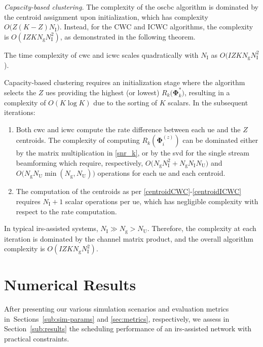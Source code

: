 \emph{Capacity-based clustering.}
The complexity of the \gls{oscbc} algorithm is dominated by the centroid assignment upon initialization, which has complexity $O\big(Z(K-Z)N_{\mathrm I}\big)$. Instead, for the CWC and ICWC algorithms, the complexity is $O(IZKN_{\mathrm g}N_{\mathrm I}^2)$, as demonstrated in the following theorem.

\begin{theorem}
The time complexity of \gls{cwc} and \gls{icwc} scales quadratically with $N_{\mathrm I}$ as $O(IZKN_{\mathrm g}N_{\mathrm I}^2$).
\end{theorem}
\begin{IEEEproof}
Capacity-based clustering requires an initialization stage where the algorithm selects the $Z$ \glspl{ue} providing the highest (or lowest) $R_k\big(\bm{\Phi}^*_k\big)$, resulting in a complexity of $O(K\log K)$ due to the sorting of $K$ scalars.
In the subsequent iterations:
\begin{enumerate}
    \item Both \gls{cwc} and \gls{icwc} compute the rate difference between each \gls{ue} and the $Z$ centroids. The complexity of computing $R_k(\bm{\Phi}^{(z)}_{i})$ can be dominated either by the matrix multiplication in \eqref{snr_k}, or by the \gls{svd} for the single stream beamforming which require, respectively, $O\big(N_{\mathrm g}N_{\mathrm I}^2 + N_{\mathrm g}N_{\mathrm I}N_{\mathrm U}\big)$ and $O\big(N_{\mathrm g}N_{\mathrm U}\min(N_{\mathrm g},N_{\mathrm U})\big)$ operations for each \gls{ue} and each centroid.
    \item The computation of the centroids as per \eqref{centroidCWC}-\eqref{centroidICWC} requires $N_{\mathrm I}+1$ scalar operations per \gls{ue}, which has negligible complexity with respect to the rate computation.
 \end{enumerate}
In typical \gls{irs}-assisted systems, $N_{\mathrm I}\gg N_{\mathrm g}>N_{\mathrm U}$. Therefore, the complexity at each iteration is dominated by the channel matrix product, and the overall algorithm complexity is $O(IZKN_{\mathrm g}N_{\mathrm I}^2)$. 
\end{IEEEproof}

\section{Numerical Results}\label{sec:numerical_results}

After presenting our various simulation scenarios and evaluation metrics in~Sections~\ref{sub:sim-params} and \ref{sec:metrics}, respectively, we assess in Section~\ref{sub:results} the scheduling performance of an \gls{irs}-assisted network with practical constraints.

